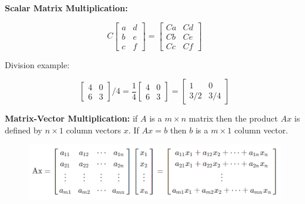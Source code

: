 \documentclass{article}
\begin{document}
        \noindent \textbf{Scalar Matrix Multiplication:}

        \begin{equation*}
            C   \begin{bmatrix}
                    a & d \\
                    b & e \\
                    c & f
                \end{bmatrix}
            =
                \begin{bmatrix}
                    Ca & Cd \\
                    Cb & Ce \\
                    Cc & Cf
                \end{bmatrix}
        \end{equation*}

        \noindent Division example:

        \begin{equation*}
            \begin{bmatrix}
                4 & 0 \\
                6 & 3
            \end{bmatrix}
            /4
            =
            \frac{1}{4}
            \begin{bmatrix}
                4 & 0 \\
                6 & 3
            \end{bmatrix}
            =
            \begin{bmatrix}
                1   & 0 \\
                3/2 & 3/4
            \end{bmatrix}
        \end{equation*}

        \noindent \textbf{Matrix-Vector Multiplication:} if $A$ is a $m\times n$ matrix then the product $Ax$
        is defined by $n\times 1$ column vectors $x$. If $Ax=b$ then $b$ is a $m\times 1$ column vector.

        \begin{figure}[hbt!]
            \centering
            \includegraphics[scale=0.75]{Resources/Matrix_Vector_Mult}
        \end{figure}
\end{document}
